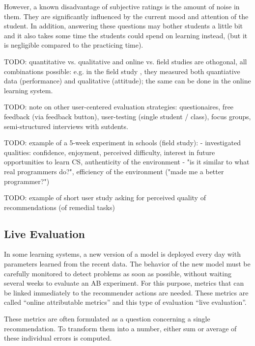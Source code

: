However, a known disadvantage of subjective ratings is the amount of noise
in them. They are significantly influenced by the current mood and attention of
the student.
In addition, answering these questions may bother students a little bit
and it also takes some time the students could spend on learning instead,
(but it is negligible compared to the practicing time).

TODO: quantitative vs. qualitative and online vs. field studies are othogonal,
all combinations possible: e.g. in the field study \cite{comparing-blocks-text-weintrop2017},
they measured both quantiative data (performance) and qualitative (attitude);
the same can be done in the online learning system.

TODO: note on other user-centered evaluation strategies:
questionaires, free feedback (via feedback button), user-testing (single student / class), focus groups, semi-structured interviews with sutdents.

TODO: example of a 5-week experiment in schools (field study):
\cite{comparing-blocks-text-weintrop2017}
- investigated qualities: confidence, enjoyment, perceived difficulty, interest in future opportunities to learn CS, authenticity of the environment - "is it similar to what real programmers do?", efficiency of the environment ("made me a better programmer?")

TODO: example of short user study asking for perceived quality of recommendations
(of remedial tasks) \cite{learner-models-integration-skills}

\subsection{Live Evaluation}
\label{sec:live-evaluation}

In some learning systems, a new version of a model is deployed every day
  with parameters learned from the recent data.
The behavior of the new model must be carefully monitored
  to detect problems as soon as possible,
  without waiting several weeks to evaluate an AB experiment.
For this purpose, metrics that can be linked immediately
  to the recommender actions are needed.
These metrics are called ``online attributable metrics''  %
and this type of evaluation ``live evaluation''.

These metrics are often formulated as a question concerning a single recommendation.
To transform them into a number, either sum or average of these individual errors is computed.

